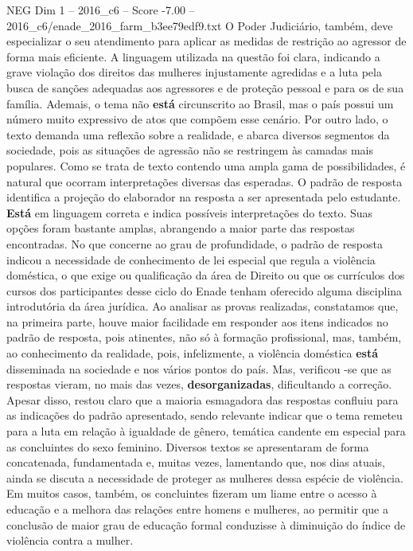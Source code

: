 \begin{textsample}{NEG Dim 1 – 2016\_c6 – Score -7.00 – 2016\_c6/enade\_2016\_farm\_b3ee79edf9.txt}
O Poder Judiciário, também, deve especializar o seu atendimento para aplicar as medidas de restrição ao agressor de forma mais eficiente.
A linguagem utilizada na questão foi clara, indicando a grave violação dos direitos das mulheres injustamente agredidas e a luta pela busca de sanções adequadas aos agressores e de proteção pessoal e para os de sua família.
Ademais, o tema não \textbf{está} circunscrito ao Brasil, mas o país possui um número muito expressivo de atos que compõem esse cenário.
Por outro lado, o texto demanda uma reflexão sobre a realidade, e abarca diversos segmentos da sociedade, pois as situações de agressão não se restringem às camadas mais populares.
Como se trata de texto contendo uma ampla gama de possibilidades, é natural que ocorram interpretações diversas das esperadas.
O padrão de resposta identifica a projeção do elaborador na resposta a ser apresentada pelo estudante. \textbf{Está} em linguagem correta e indica possíveis interpretações do texto.
Suas opções foram bastante amplas, abrangendo a maior parte das respostas encontradas.
No que concerne ao grau de profundidade, o padrão de resposta indicou a necessidade de conhecimento de lei especial que regula a violência doméstica, o que exige ou qualificação da área de Direito ou que os currículos dos cursos dos participantes desse ciclo do Enade tenham oferecido alguma disciplina introdutória da área jurídica.
Ao analisar as provas realizadas, constatamos que, na primeira parte, houve maior facilidade em responder aos itens indicados no padrão de resposta, pois atinentes, não só à formação profissional, mas, também, ao conhecimento da realidade, pois, infelizmente, a violência doméstica \textbf{está} disseminada na sociedade e nos vários pontos do país.
Mas, verificou -se que as respostas vieram, no mais das vezes, \textbf{desorganizadas}, dificultando a correção.
Apesar disso, restou claro que a maioria esmagadora das respostas confluiu para as indicações do padrão apresentado, sendo relevante indicar que o tema remeteu para a luta em relação à igualdade de gênero, temática candente em especial para as concluintes do sexo feminino.
Diversos textos se apresentaram de forma concatenada, fundamentada e, muitas vezes, lamentando que, nos dias atuais, ainda se discuta a necessidade de proteger as mulheres dessa espécie de violência.
Em muitos casos, também, os concluintes fizeram um liame entre o acesso à educação e a melhora das relações entre homens e mulheres, ao permitir que a conclusão de maior grau de educação formal conduzisse à diminuição do índice de violência contra a mulher.

\end{textsample}
